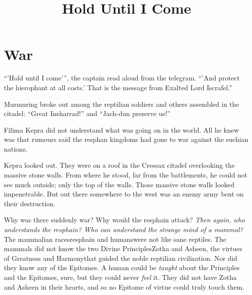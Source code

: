 \documentclass
  [a4paper,
   12pt,
   oneside
  ]%
  {article}
\title{Hold Until I Come}
\begin{document}
    \maketitle
    \tableofcontents














% 



\section{War}
``'Hold until I come'{}'', the captain read aloud from the telegram. ``'And protect the hierophant at all costs.' That is the message from Exalted Lord Iscrafel.'' 

Murmuring broke out among the reptilian soldiers and others assembled in the citadel: ``Great Insharrad!'' and ``Jach-dun preserve us!'' 

Filima Kepra did not understand what was going on in the world. 
All he knew was that rumours said the resphan kingdoms had gone to war against the suchian nations. 

Kepra looked out. 
They were on a roof in the Cressax citadel overlooking the massive stone walls. 
From where he stood, far from the battlements, he could not see much outside; only the top of the walls. 
Those massive stone walls looked impenetrable. 
But out there somewhere to the west was an enemy army bent on their destruction.

Why was there suddenly war? Why would the resphain attack? 
\emph{Then again, who understands the resphain? Who can understand the strange mind of a mammal?} 
The mammalian races\dash{}resphain and humans\dash{}were not like sane reptiles. The mammals did not know the two Divine Principles\dash{}Zotha and Asheen, the virtues of Greatness and Harmony\dash{}that guided the noble reptilian civilization. Nor did they know any of the Epitomes. A human could be \emph{taught} about the Principles and the Epitomes, sure, but they could never \emph{feel} it. They did not have Zotha and Asheen in their hearts, and so no Epitome of virtue could truly touch them. 
\end{document}
